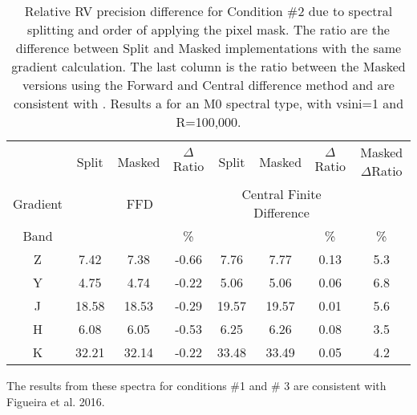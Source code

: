 
\begin{table}
    \caption{Relative RV precision difference for Condition \#2 due to spectral splitting and order of applying the pixel mask. The ratio are the difference between Split and Masked implementations with the same gradient calculation. The last column is the ratio between the Masked versions using the Forward and Central difference method and are consistent with . Results a for an M0 spectral type, with vsini=1 and R=100,000.}
    \begin{tabular}{c|ccc|ccc|c}
        \toprule
        & Split & Masked & $\Delta$Ratio & Split & Masked & $\Delta$Ratio & Masked $\Delta$Ratio\\
        Gradient &\multicolumn{3}{c|}{FFD}  &\multicolumn{3}{c|}{Central Finite Difference} & \\
        
        Band & \mps{} & \mps{} &  \%  & \mps{} & \mps{} &   \% & \% \\
        \midrule
   
        Z &  7.42 &  7.38 & -0.66 &  7.76 &  7.77 & 0.13 & 5.3\\
        Y &  4.75 &  4.74 & -0.22 &  5.06 &  5.06 & 0.06 & 6.8\\
        J & 18.58 & 18.53 & -0.29 & 19.57 & 19.57 & 0.01 & 5.6\\
        H &  6.08 &  6.05 & -0.53 &  6.25 &  6.26 & 0.08 & 3.5\\
        K & 32.21 & 32.14 & -0.22 & 33.48 & 33.49 & 0.05 & 4.2\\
        \bottomrule
    \end{tabular}
\end{table}

{\rd The results from these spectra for conditions \#1 and \# 3 are consistent with Figueira et al. 2016. }